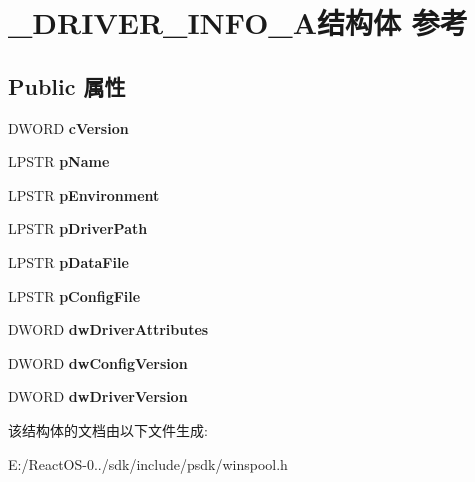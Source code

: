 \hypertarget{struct___d_r_i_v_e_r___i_n_f_o__5_a}{}\section{\+\_\+\+D\+R\+I\+V\+E\+R\+\_\+\+I\+N\+F\+O\+\_\+A结构体 参考}
\label{struct___d_r_i_v_e_r___i_n_f_o__5_a}
\subsection*{Public 属性}
\begin{DoxyCompactItemize}
\item 
\mbox{\label{struct___d_r_i_v_e_r___i_n_f_o__5_a_a7d5290b11ae63b16e43e7dc943227fa7}} 
D\+W\+O\+RD {\bfseries c\+Version}
\item 
\mbox{\label{struct___d_r_i_v_e_r___i_n_f_o__5_a_a96229239aaa489a896f04a190410fe4b}} 
L\+P\+S\+TR {\bfseries p\+Name}
\item 
\mbox{\label{struct___d_r_i_v_e_r___i_n_f_o__5_a_a0b771fc6d23b01e780d8b9c59e907a09}} 
L\+P\+S\+TR {\bfseries p\+Environment}
\item 
\mbox{\label{struct___d_r_i_v_e_r___i_n_f_o__5_a_ae6a501ab8982a54855f65f116be72044}} 
L\+P\+S\+TR {\bfseries p\+Driver\+Path}
\item 
\mbox{\label{struct___d_r_i_v_e_r___i_n_f_o__5_a_a325e7b939fa519bb63be88e9578df70d}} 
L\+P\+S\+TR {\bfseries p\+Data\+File}
\item 
\mbox{\label{struct___d_r_i_v_e_r___i_n_f_o__5_a_ab5706f23b67a15f0a84e13b764050f38}} 
L\+P\+S\+TR {\bfseries p\+Config\+File}
\item 
\mbox{\label{struct___d_r_i_v_e_r___i_n_f_o__5_a_afd0ca0154f54f9cb707a910b068436d0}} 
D\+W\+O\+RD {\bfseries dw\+Driver\+Attributes}
\item 
\mbox{\label{struct___d_r_i_v_e_r___i_n_f_o__5_a_af13c59d18ea1d515f0733aa2e9df5083}} 
D\+W\+O\+RD {\bfseries dw\+Config\+Version}
\item 
\mbox{\label{struct___d_r_i_v_e_r___i_n_f_o__5_a_aadb636f6a61c9284b78c885407bb39b8}} 
D\+W\+O\+RD {\bfseries dw\+Driver\+Version}
\end{DoxyCompactItemize}


该结构体的文档由以下文件生成\+:\begin{DoxyCompactItemize}
\item 
E\+:/\+React\+O\+S-\/0../sdk/include/psdk/winspool.\+h\end{DoxyCompactItemize}
